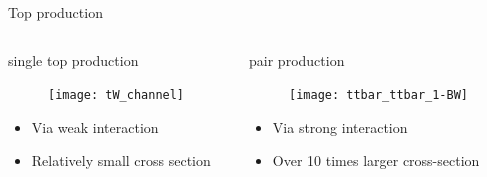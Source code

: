 \begin{frame}{Top production}
    \begin{columns}
        \begin{column}{0.5\textwidth}
            \vspace{-0.4cm}
        \begin{block}{\tW single top production}
        \end{block}
			\begin{figure}
	            \centering
	            \texttt{[image: tW\_channel]}
	        \end{figure}
	        \begin{itemize}
	        \item Via weak interaction
	        \item Relatively small cross section
	        \end{itemize}
        \end{column}
        \begin{column}{0.5\textwidth}
        \begin{block}{\ttbar pair production}
        \end{block}
        \begin{figure}
            \centering
            \texttt{[image: ttbar\_ttbar\_1-BW]}
        \end{figure}
        \begin{itemize}
        	\item Via strong interaction
        	\item Over 10 times larger cross-section
        \end{itemize}
        \end{column}
    \end{columns}
\end{frame}

